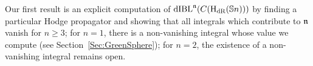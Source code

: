 \documentclass[\MainFolder/Text.tex]{subfiles}
\begin{document}
%

Our first result is an explicit computation of $\mathrm{dIBL}^{\mathfrak{n}}(C(\mathrm{H}_{\mathrm{dR}}({\mathbb{S}{n}})))$ by finding a particular Hodge propagator and showing that all integrals which contribute to $\mathfrak{n}$ vanish for $n\ge 3$; for $n=1$, there is a non-vanishing integral whose value we compute (see Section~\ref{Sec:GreenSphere}); for $n=2$, the existence of a non-vanishing integral remains open.
\end{document}
